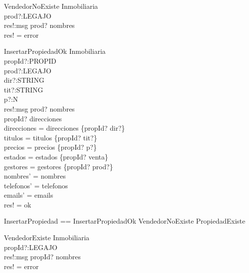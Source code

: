 \begin{schema}{VendedorNoExiste}
\Xi Inmobiliaria \\
prod?:LEGAJO \\
res!:msg
\where
prod? \notin \dom nombres \\
res! = error
\end{schema}

\begin{schema}{InsertarPropiedadOk}
\Delta Inmobiliaria \\
propId?:PROPID \\
prod?:LEGAJO \\
dir?:STRING \\
tit?:STRING \\
p?:N \\
res!:msg
\where
prod? \in \dom nombres \\
propId? \notin \dom direcciones \\
direcciones =  direcciones \cup \{propId? \mapsto dir?\}  \\
titulos = titulos \cup \{propId? \mapsto tit?\}  \\
precios = precios \cup \{propId? \mapsto p?\}  \\
estados = estados \cup \{propId? \mapsto venta\}  \\
gestores = gestores \cup \{propId? \mapsto prod?\}  \\
nombres' =  nombres  \\
telefonos' =  telefonos  \\
emails' =  emails  \\
res! = ok
\end{schema}

\begin{zed}
InsertarPropiedad == InsertarPropiedadOk \lor VendedorNoExiste \lor PropiedadExiste
\end{zed}

\begin{schema}{VendedorExiste}
\Xi Inmobiliaria \\
propId?:LEGAJO \\
res!:msg
\where
propId? \in \dom nombres \\
res! = error
\end{schema}

